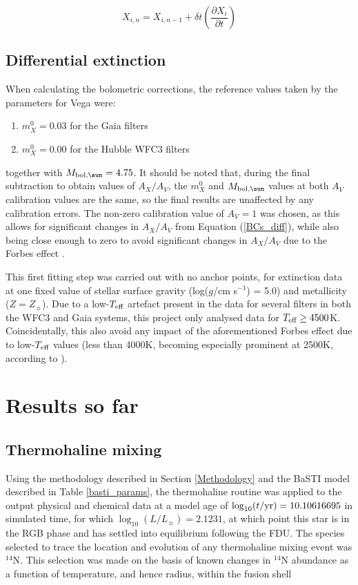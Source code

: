 \documentclass[usenatbib]{mnras}
\begin{document}
\begin{equation}
X_{i,n} = X_{i,n-1} + \delta t \left( \frac{\partial X_{i}}{\partial t}\right)
\label{iter_timeind}
\end{equation}

\subsection{Differential extinction}
When calculating the bolometric corrections, the reference values taken by the parameters for Vega were:
\begin{enumerate}
\item $m_{X}^{0} = 0.03$ for the Gaia filters
\item $m_{X}^{0} = 0.00$ for the Hubble WFC3 filters
\end{enumerate}

together with $M_{\textnormal{bol},\sun} = 4.75$. It should be noted that, during the final subtraction to obtain values of $A_{X}/A_{V}$, the $m_{X}^{0}$ and $M_{\textnormal{bol},\sun}$ values at both $A_{V}$ calibration values are the same, so the final results are unaffected by any calibration errors. The non-zero calibration value of $A_{V} = 1$ was chosen, as this allows for significant changes in $A_{X}/A_{V}$ from Equation (\ref{BCs_diff}), while also being close enough to zero to avoid significant changes in $A_{X}/A_{V}$ due to the Forbes effect \citep{2008PASP..120..583G}.

This first fitting step was carried out with no anchor points, for  extinction data at one fixed value of stellar surface gravity (log($g$/cm s$^{-1}$) = 5.0) and metallicity ($Z = Z_{\sun}$). Due to a low-$T_{\textnormal{eff}}$ artefact present in the data for several filters in both the WFC3 and Gaia systems, this project only analysed data for $T_{\textnormal{eff}} \geq 4500$K. Coincidentally, this also avoid any impact of the aforementioned Forbes effect due to low-$T_{\textnormal{eff}}$ values (less than 4000K, becoming especially prominent at 2500K, according to \citet{2008PASP..120..583G}).

\section{Results so far}
\subsection{Thermohaline mixing}
Using the methodology described in Section \ref{Methodology} and the BaSTI model described in Table \ref{basti_params}, the thermohaline routine was applied to the output physical and chemical data at a model age of $\log_{10}(t/\textnormal{yr}) = 10.10616695$ in simulated time, for which $\log_{10}(L/L_{\sun}) = 2.1231$, at which point this star is in the RGB phase and has settled into equilibrium following the FDU. The species selected to trace the location and evolution of any thermohaline mixing event was $^{14}$N. This selection was made on the basis of known changes in $^{14}$N abundance as a function of temperature, and hence radius, within the fusion shell
\end{document}
